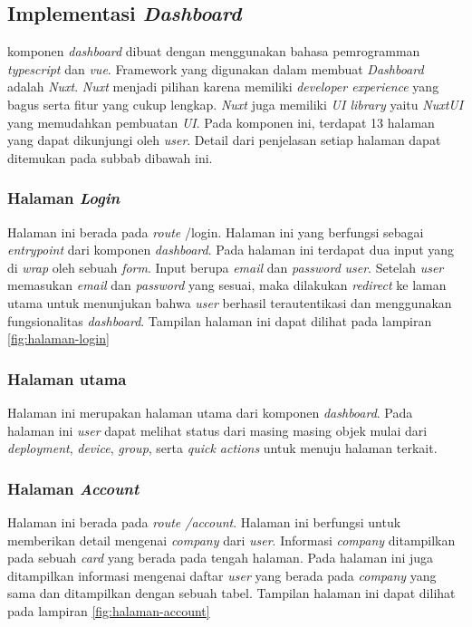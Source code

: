 \subsection{Implementasi \textit{Dashboard}}
komponen \textit{dashboard} dibuat dengan menggunakan bahasa pemrogramman \textit{typescript} dan \textit{vue}. Framework yang digunakan dalam membuat \textit{Dashboard} adalah \textit{Nuxt}. \textit{Nuxt} menjadi pilihan karena memiliki \textit{developer experience} yang bagus serta fitur yang cukup lengkap. \textit{Nuxt} juga memiliki \textit{UI library} yaitu \textit{NuxtUI} yang memudahkan pembuatan \textit{UI}. Pada komponen ini, terdapat 13 halaman yang dapat dikunjungi oleh \textit{user}. Detail dari penjelasan setiap halaman dapat ditemukan pada subbab dibawah ini.

\subsubsection{Halaman \textit{Login}}
Halaman ini berada pada \textit{route} /login. Halaman ini yang berfungsi sebagai \textit{entrypoint} dari komponen \textit{dashboard}. Pada halaman ini terdapat dua input yang di \textit{wrap} oleh sebuah \textit{form}. Input berupa \textit{email} dan \textit{password} \textit{user}. Setelah \textit{user} memasukan \textit{email} dan \textit{password} yang sesuai, maka dilakukan \textit{redirect} ke laman utama untuk menunjukan bahwa \textit{user} berhasil terautentikasi dan menggunakan fungsionalitas \textit{dashboard}. Tampilan halaman ini dapat dilihat pada lampiran \ref{fig:halaman-login}

\subsubsection{Halaman utama}
Halaman ini merupakan halaman utama dari komponen \textit{dashboard}. Pada halaman ini \textit{user} dapat melihat status dari masing masing objek mulai dari \textit{deployment}, \textit{device}, \textit{group}, serta \textit{quick actions} untuk menuju halaman terkait.

\subsubsection{Halaman \textit{Account}}
Halaman ini berada pada \textit{route /account}. Halaman ini berfungsi untuk memberikan detail mengenai \textit{company} dari \textit{user}. Informasi \textit{company} ditampilkan pada sebuah \textit{card} yang berada pada tengah halaman. Pada halaman ini juga ditampilkan informasi mengenai daftar \textit{user} yang berada pada \textit{company} yang sama dan ditampilkan dengan sebuah tabel. Tampilan halaman ini dapat dilihat pada lampiran \ref{fig:halaman-account}

